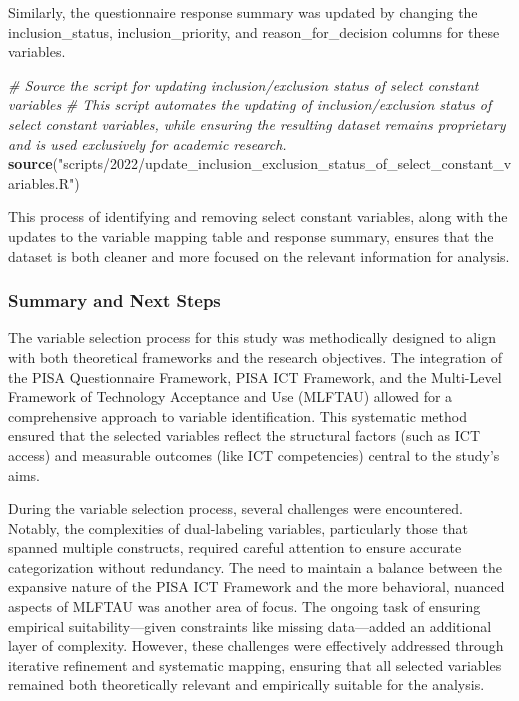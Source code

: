 \documentclass[
]{article}
\newenvironment{Shaded}{\begin{snugshade}}{\end{snugshade}}
\newcommand{\CommentTok}[1]{\textcolor[rgb]{0.56,0.35,0.01}{\textit{#1}}}
\newcommand{\FunctionTok}[1]{\textcolor[rgb]{0.13,0.29,0.53}{\textbf{#1}}}
\newcommand{\NormalTok}[1]{#1}
\newcommand{\StringTok}[1]{\textcolor[rgb]{0.31,0.60,0.02}{#1}}
\begin{document}
Similarly, the questionnaire response summary was updated by changing
the inclusion\_status, inclusion\_priority, and reason\_for\_decision
columns for these variables.

\begin{Shaded}
\begin{Highlighting}[]
\CommentTok{\# Source the script for updating inclusion/exclusion status of select constant variables}
\CommentTok{\# This script automates the updating of inclusion/exclusion status of select constant variables, while ensuring the resulting dataset remains proprietary and is used exclusively for academic research.}
\FunctionTok{source}\NormalTok{(}\StringTok{"scripts/2022/update\_inclusion\_exclusion\_status\_of\_select\_constant\_variables.R"}\NormalTok{)}
\end{Highlighting}
\end{Shaded}

This process of identifying and removing select constant variables,
along with the updates to the variable mapping table and response
summary, ensures that the dataset is both cleaner and more focused on
the relevant information for analysis.

\hypertarget{summary-and-next-steps-1}{%
\subsubsection{Summary and Next Steps}\label{summary-and-next-steps-1}}

The variable selection process for this study was methodically designed
to align with both theoretical frameworks and the research objectives.
The integration of the PISA Questionnaire Framework, PISA ICT Framework,
and the Multi-Level Framework of Technology Acceptance and Use (MLFTAU)
allowed for a comprehensive approach to variable identification. This
systematic method ensured that the selected variables reflect the
structural factors (such as ICT access) and measurable outcomes (like
ICT competencies) central to the study's aims.

During the variable selection process, several challenges were
encountered. Notably, the complexities of dual-labeling variables,
particularly those that spanned multiple constructs, required careful
attention to ensure accurate categorization without redundancy. The need
to maintain a balance between the expansive nature of the PISA ICT
Framework and the more behavioral, nuanced aspects of MLFTAU was another
area of focus. The ongoing task of ensuring empirical
suitability---given constraints like missing data---added an additional
layer of complexity. However, these challenges were effectively
addressed through iterative refinement and systematic mapping, ensuring
that all selected variables remained both theoretically relevant and
empirically suitable for the analysis.
\end{document}
